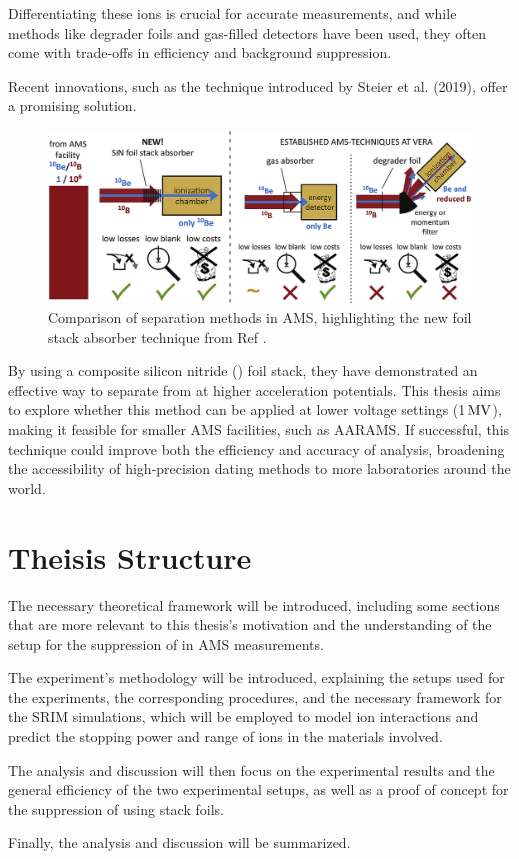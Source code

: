 Differentiating these ions is crucial for accurate measurements, and while methods like degrader foils and gas-filled detectors have been used, they often come with trade-offs in efficiency and background suppression.

Recent innovations, such as the technique introduced by Steier et al. (2019), offer a promising solution. 

\begin{figure}[ht]
    \centering
    \includegraphics[width=1\linewidth]{B/Generalideaofspecialtheiss.jpg}
    \caption{Comparison of separation methods in AMS, highlighting the new  foil stack absorber technique from Ref \cite{steier2019}.}
    \label{fig:enter-label}
\end{figure}


By using a composite silicon nitride () foil stack, they have demonstrated an effective way to separate  from  at higher acceleration potentials. This thesis aims to explore whether this method can be applied at lower voltage settings (1$\, \mathrm{MV}$), making it feasible for smaller AMS facilities, such as AARAMS. If successful, this technique could improve both the efficiency and accuracy of  analysis, broadening the accessibility of high-precision dating methods to more laboratories around the world.


\section{Theisis Structure}
The necessary theoretical framework will be introduced, including some sections that are more relevant to this thesis's motivation and the understanding of the setup for the suppression of  in  AMS measurements.

The experiment's methodology will be introduced, explaining the setups used for the experiments, the corresponding procedures, and the necessary framework for the SRIM simulations, which will be employed to model ion interactions and predict the stopping power and range of ions in the materials involved.

The analysis and discussion will then focus on the experimental results and the general efficiency of the two experimental setups, as well as a proof of concept for the suppression of  using  stack foils.

Finally, the analysis and discussion will be summarized.
\newpage